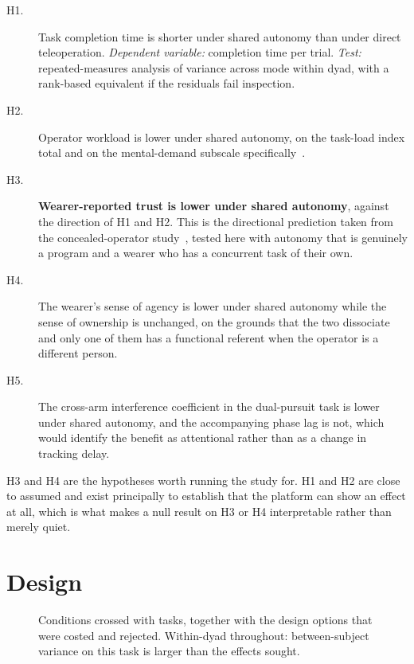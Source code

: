 \begin{description}
  \item[H1.] Task completion time is shorter under shared autonomy than under
    direct teleoperation. \emph{Dependent variable:} completion time per
    trial. \emph{Test:} repeated-measures analysis of variance across mode
    within dyad, with a rank-based equivalent if the residuals fail
    inspection.
  \item[H2.] Operator workload is lower under shared autonomy, on the
    task-load index total and on the mental-demand subscale
    specifically~\cite{hart1988nasatlx}.
  \item[H3.] \textbf{Wearer-reported trust is lower under shared autonomy},
    against the direction of H1 and H2. This is the directional prediction
    taken from the concealed-operator study~\cite{zhou2026proxemics}, tested
    here with autonomy that is genuinely a program and a wearer who has a
    concurrent task of their own.
  \item[H4.] The wearer's sense of agency is lower under shared autonomy while
    the sense of ownership is unchanged, on the grounds that the two
    dissociate~\cite{longo2008embodiment} and only one of them has a
    functional referent when the operator is a different person.
  \item[H5.] The cross-arm interference coefficient in the dual-pursuit task
    is lower under shared autonomy, and the accompanying phase lag is not,
    which would identify the benefit as attentional rather than as a change in
    tracking delay.
\end{description}

H3 and H4 are the hypotheses worth running the study for. H1 and H2 are close
to assumed and exist principally to establish that the platform can show an
effect at all, which is what makes a null result on H3 or H4 interpretable
rather than merely quiet.

\section{Design}

\begin{figure}[htbp]
  \centering
  
  \caption[Experimental design]{Conditions crossed with tasks, together with
  the design options that were costed and rejected. Within-dyad throughout:
  between-subject variance on this task is larger than the effects sought.}
  \label{fig:expdesign}
\end{figure}

